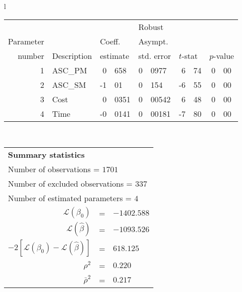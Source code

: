   \begin{tabular}{l}
\begin{tabular}{rlr@{.}lr@{.}lr@{.}lr@{.}l}
         &                       &   \multicolumn{2}{l}{}    & \multicolumn{2}{l}{Robust}  &     \multicolumn{4}{l}{}   \\
Parameter &                       &   \multicolumn{2}{l}{Coeff.}      & \multicolumn{2}{l}{Asympt.}  &     \multicolumn{4}{l}{}   \\
number &  Description                     &   \multicolumn{2}{l}{estimate}      & \multicolumn{2}{l}{std. error}  &   \multicolumn{2}{l}{$t$-stat}  &   \multicolumn{2}{l}{$p$-value}   \\

\hline

1 & ASC_PM  & 0&658 & 0&0977 & 6&74 & 0&00\\
2 & ASC_SM & -1&01 & 0&154 & -6&55 & 0&00\\
3 & Cost & 0&0351 & 0&00542 & 6&48 & 0&00\\
4 & Time & -0&0141 & 0&00181 & -7&80 & 0&00\\
\hline
\end{tabular}
\\
\begin{tabular}{rcl}
\multicolumn{3}{l}{\bf Summary statistics}\\
\multicolumn{3}{l}{ Number of observations = $1701$} \\
\multicolumn{3}{l}{ Number of excluded observations = $337$} \\
\multicolumn{3}{l}{ Number of estimated  parameters = $4$} \\
 $\mathcal{L}(\beta_0)$ &=&  $-1402.588$ \\
 $\mathcal{L}(\hat{\beta})$ &=& $-1093.526 $  \\
 $-2[\mathcal{L}(\beta_0) -\mathcal{L}(\hat{\beta})]$ &=& $618.125$ \\
    $\rho^2$ &=&   $0.220$ \\
    $\bar{\rho}^2$ &=&    $0.217$ \\
\end{tabular}
  \end{tabular}
